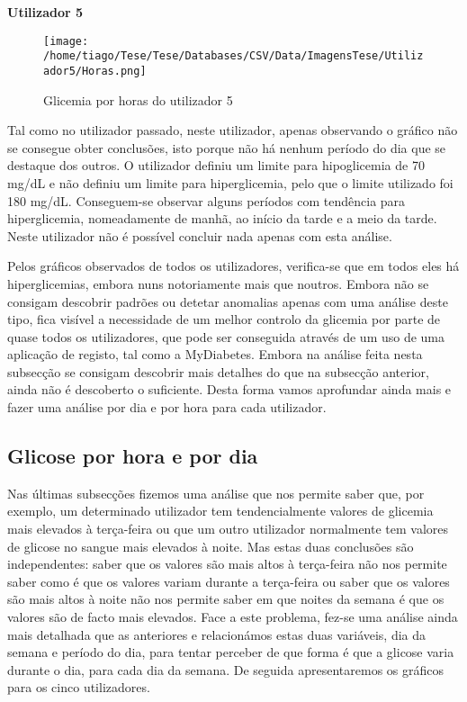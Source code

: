 \textbf{Utilizador 5}

\begin{figure}[H]
\centering
\texttt{[image: /home/tiago/Tese/Tese/Databases/CSV/Data/ImagensTese/Utilizador5/Horas.png]}
\caption{Glicemia por horas do utilizador 5}
\end{figure}


Tal como no utilizador passado, neste utilizador, apenas observando o gráfico não se consegue obter conclusões, isto porque não há nenhum período do dia que se destaque dos outros. O utilizador definiu um limite para hipoglicemia de 70 mg/dL e não definiu um limite para hiperglicemia, pelo que o limite utilizado foi 180 mg/dL. Conseguem-se observar alguns períodos com tendência para hiperglicemia, nomeadamente de manhã, ao início da tarde e a meio da tarde. Neste utilizador não é possível concluir nada apenas com esta análise.\newline

Pelos gráficos observados de todos os utilizadores, verifica-se que em todos eles há hiperglicemias, embora nuns notoriamente mais que noutros. Embora não se consigam descobrir padrões ou detetar anomalias apenas com uma análise deste tipo, fica visível a necessidade de um melhor controlo da glicemia por parte de quase todos os utilizadores, que pode ser conseguida através de um uso de uma aplicação de registo, tal como a MyDiabetes. Embora na análise feita nesta subsecção se consigam descobrir mais detalhes do que na subsecção anterior, ainda não é descoberto o suficiente. Desta forma vamos aprofundar ainda mais e fazer uma análise por dia e por hora para cada utilizador.

\subsection{Glicose por hora e por dia}

Nas últimas subsecções fizemos uma análise que nos permite saber que, por exemplo, um determinado utilizador tem tendencialmente valores de glicemia mais elevados à terça-feira ou que um outro utilizador normalmente tem valores de glicose no sangue mais elevados à noite. Mas estas duas conclusões são independentes: saber que os valores são mais altos à terça-feira não nos permite saber como é que os valores variam durante a terça-feira ou saber que os valores são mais altos à noite não nos permite saber em que noites da semana é que os valores são de facto mais elevados. Face a este problema, fez-se uma análise ainda mais detalhada que as anteriores e relacionámos estas duas variáveis, dia da semana e período do dia, para tentar perceber de que forma é que a glicose varia durante o dia, para cada dia da semana. De seguida apresentaremos os gráficos para os cinco utilizadores. 

